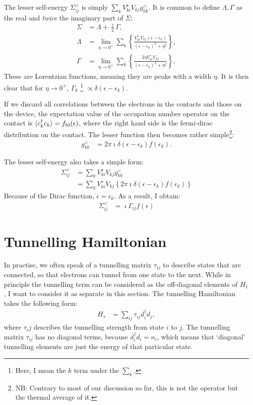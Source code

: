 The lesser self-energy $\Sigma^<_{ij}$ is simply $\sum_{k} V_{ki}^\star V_{kj} g_{kk}^<$. It is common to define  $\Lambda, \Gamma$ as the real and \emph{twice} the imaginary part of $\Sigma$:
\begin{align*}
\Sigma &= \Lambda + \frac{\imath}{2} \Gamma ,\\
\Lambda &=  \lim_{\eta\rightarrow 0^+}\sum_{k} \left\{ \frac{V_{ki}^\star V_{kj} \left(\epsilon-\epsilon_{k}\right)}{  \left(\epsilon-\epsilon_{k}\right)^2 + \eta^2}\right\} ,\\
\Gamma &= 
\lim_{\eta\rightarrow 0^+}\sum_{k} \left\{ \frac{2 \eta V_{ki}^\star V_{kj}}{  \left(\epsilon-\epsilon_{k}\right)^2 + \eta^2}\right\}.
\end{align*}
These are Lorentzian functions, meaning they are peaks with a width $\eta$. It is then clear that for $\eta\rightarrow 0^+$, $\Gamma_{k}$ \footnote{Here, I mean the $k$ term under the $\sum_{k}$.} $\propto \delta(\epsilon-\epsilon_{k})$. 

If we discard all correlations between the electrons in the contacts and those on the device, the expectation value of the occupation number operator on the contact is $\braket{c_{k}^\dagger c_{k}}=f_\text{fd}(\epsilon)$, where the right hand side is the fermi-dirac distribution on the contact. The lesser function then becomes rather simple\footnote{NB: Contrary to most of our discussion so far, this is not the operator but the thermal average of it.}:
\begin{align*}
g^<_{kk} &= 2\pi\imath \delta(\epsilon-\epsilon_{k}) f(\epsilon_{k}).
\end{align*}

The lesser self-energy also takes a simple form:
\begin{align*}
\Sigma^<_{ij} &= \sum_{k} V_{ki}^\star V_{kj} g_{kk}^< \\&= \sum_{k} V_{ki}^\star V_{kj} \left\{2\pi\imath \delta(\epsilon-\epsilon_{k}) f(\epsilon_{k})\right\}
\end{align*}
Because of the Dirac function, $\epsilon=\epsilon_{k}$. As a result, I obtain:
\begin{align}
\Sigma^<_{ij} &= \imath \Gamma_{ij} f(\epsilon) \label{eq:lesserself}
\end{align}
\section{Tunnelling Hamiltonian}
\label{sec:tunnelling}
In practise, we often speak of a tunnelling matrix $\tau_{ij}$ to describe states that are connected, so that electrons can tunnel from one state to the next. While in principle the tunnelling term can be considered as the off-diagonal elements of $H_1$, I want to consider it as separate in this section. The tunnelling Hamiltonian takes the following form:
\begin{align}
H_\tau &= \sum_{ij} \tau_{ij} d_i^\dagger d_j,
\label{eq:tunnelling}
\end{align}
where $\tau_ij$ describes the tunnelling strength from state $i$ to $j$. The tunnelling matrix $\tau_{ij}$ has no diagonal terms, because $d_i^\dagger d_i = n_i$, which means that `diagonal' tunnelling elements are just the energy of that particular state.


